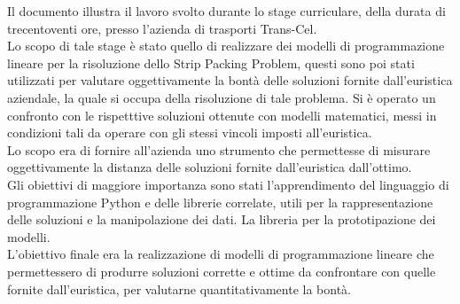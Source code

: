 
Il documento illustra il lavoro svolto durante lo stage curriculare, della durata di trecentoventi ore, presso l’azienda di trasporti Trans-Cel.\\
Lo scopo di tale stage è stato quello di realizzare dei modelli di programmazione lineare per la risoluzione dello Strip Packing Problem, questi sono poi stati utilizzati per valutare oggettivamente la bontà delle soluzioni fornite dall'euristica aziendale, la quale si occupa della risoluzione di tale problema.
Si è operato un confronto con le rispetttive soluzioni ottenute con modelli matematici, messi in condizioni tali da operare con gli stessi vincoli imposti all'euristica.\\
Lo scopo era di fornire all'azienda uno strumento che permettesse di misurare oggettivamente la distanza delle soluzioni fornite dall'euristica dall'ottimo.\\
\newline
Gli obiettivi di maggiore importanza sono stati l'apprendimento del linguaggio di programmazione Python e delle librerie correlate, utili per la rappresentazione delle soluzioni e la manipolazione dei dati. La libreria  per la prototipazione dei modelli.\\
L'obiettivo finale era la realizzazione di modelli di programmazione lineare che permettessero di produrre soluzioni corrette e ottime da confrontare con quelle fornite dall'euristica, per valutarne quantitativamente la bontà.